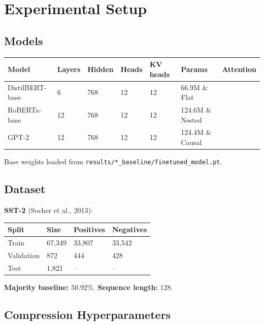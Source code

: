 
\section{Experimental Setup}

\subsection{Models}

\begin{table}[H]
\centering
\small
\begin{tabular}{lllllll}
\toprule
\textbf{Model} & \textbf{Layers} & \textbf{Hidden} & \textbf{Heads} & \textbf{KV heads} & \textbf{Params} & \textbf{Attention} \\
\midrule
DistilBERT-base & 6 & 768 & 12 & 12 & 66.9M \& Flat \\
RoBERTa-base & 12 & 768 & 12 & 12 & 124.6M \& Nested \\
GPT-2 & 12 & 768 & 12 & 12 & 124.4M \& Causal \\
\bottomrule
\end{tabular}
\end{table}

Base weights loaded from \texttt{results/*\_baseline/finetuned\_model.pt}.

\subsection{Dataset}

\textbf{SST-2} (Socher et al., 2013):

\begin{table}[H]
\centering
\small
\begin{tabular}{llll}
\toprule
\textbf{Split} & \textbf{Size} & \textbf{Positives} & \textbf{Negatives} \\
\midrule
Train & 67,349 & 33,807 & 33,542 \\
Validation & 872 & 444 & 428 \\
Test & 1,821 & -- & -- \\
\bottomrule
\end{tabular}
\end{table}

\textbf{Majority baseline:} 50.92\%. \textbf{Sequence length:} 128.

\subsection{Compression Hyperparameters}

